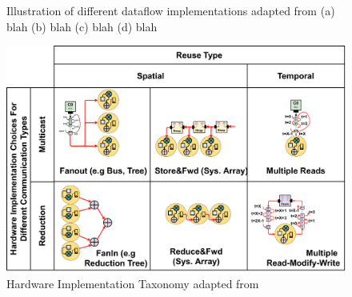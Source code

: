 \begin{figure}
    \centering
    \hspace{0.1cm} 
    \hspace{0.1cm} 
    \hspace{0.1cm} 
    \caption{Illustration of different dataflow implementations adapted from \cite{dnn_df_overrated} (a) blah (b) blah (c) blah (d) blah}
    \label{fig:unroll_illustration}
\end{figure}

\begin{figure}[ht]
    \centering
    \includegraphics[scale=0.58]{fig/hw_taxonomy.pdf}
    \caption{Hardware Implementation Taxonomy adapted from \cite{maestro}}
    \label{fig:hw_taxonomy}
\end{figure}


